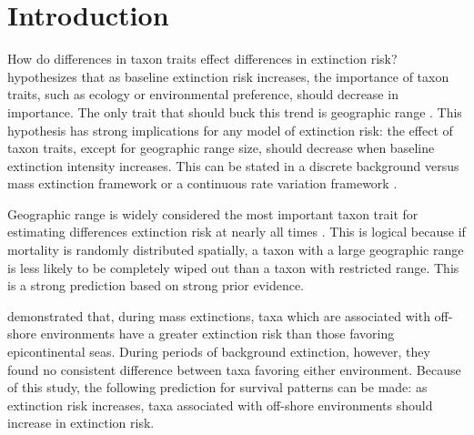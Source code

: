 \documentclass[12pt,letterpaper]{article}
\begin{document}
\section{Introduction}

How do differences in taxon traits effect differences in extinction risk? \citet{Jablonski1987} hypothesizes that as baseline extinction risk increases, the importance of taxon traits, such as ecology or environmental preference, should decrease in importance. The only trait that should buck this trend is geographic range \citep{Jablonski1987}. This hypothesis has strong implications for any model of extinction risk: the effect of taxon traits, except for geographic range size, should decrease when baseline extinction intensity increases. This can be stated in a discrete background versus mass extinction framework \citep{Jablonski1987} or a continuous rate variation framework \citep{Wang2003}.%

Geographic range is widely considered the most important taxon trait for estimating differences extinction risk at nearly all times \citep{Jablonski1986,Jablonski1987,Jablonski2003,Payne2007}. This is logical because if mortality is randomly distributed spatially, a taxon with a large geographic range is less likely to be completely wiped out than a taxon with restricted range. This is a strong prediction based on strong prior evidence. %

\citet{Miller2009a} demonstrated that, during mass extinctions, taxa which are associated with off-shore environments have a greater extinction risk than those favoring epicontinental seas. During periods of background extinction, however, they found no consistent difference between taxa favoring either environment. Because of this study, the following prediction for survival patterns can be made: as extinction risk increases, taxa associated with off-shore environments should increase in extinction risk.

\end{document}

